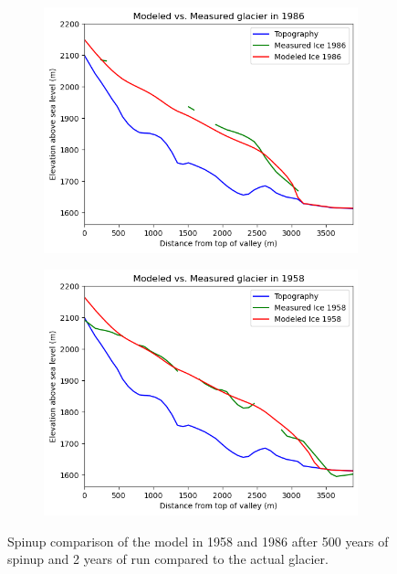 \documentclass{article}
\begin{document}
\begin{figure}[h]
    \centering
    \begin{subfigure}[b]{0.49\textwidth}
        \centering
        \includegraphics[width=\textwidth]{Plots/1986_glacier_comparison.png}
        \label{fig:1986_glacier_comparison}
    \end{subfigure}
    \hfill
    \begin{subfigure}[b]{0.49\textwidth}
        \centering
        \includegraphics[width=\textwidth]{Plots/1958_glacier_comparison.png}
        \label{fig:1958_glacier_comparison}
    \end{subfigure}
    \caption{Spinup comparison of the model in 1958 and 1986 after 500 years of spinup and 2 years of run compared to the actual glacier.}
    \label{fig:glacier_comparison}
\end{figure}
\FloatBarrier
\end{document}
